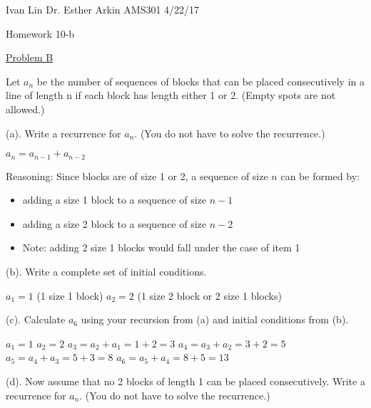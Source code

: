 \documentclass{article}
\begin{document}
Ivan Lin\newline{}
Dr. Esther Arkin\newline{}
AMS301\newline{}
4/22/17

\begin{center}
  Homework 10-b
\end{center}

\underline{Problem B}

Let $a_n$ be the number of sequences of blocks that can be placed consecutively in a line of length n if each block has length either 1 or 2. (Empty spots are not allowed.)\newline{}

(a). Write a recurrence for $a_n$. (You do not have to solve the recurrence.)\newline{}

$a_n=a_{n-1}+a_{n-2}$\newline{}


Reasoning: Since blocks are of size 1 or 2, a sequence of size $n$ can be formed by:
\begin{itemize}
  \item adding a size 1 block to a sequence of size $n-1$
  \item adding a size 2 block to a sequence of size $n-2$
  \item Note: adding 2 size 1 blocks would fall under the case of item 1
\end{itemize}

(b). Write a complete set of initial conditions.\newline{}

$a_1=1$ (1 size 1 block)\newline{}
$a_2=2$ (1 size 2 block or 2 size 1 blocks)\newline{}

(c). Calculate $a_6$ using your recursion from (a) and initial conditions from (b).\newline{}

$a_1=1$\newline{}
$a_2=2$\newline{}
$a_3=a_2+a_1=1+2=3$ \newline{}
$a_4=a_3+a_2=3+2=5$ \newline{}
$a_5=a_4+a_3=5+3=8$\newline{}
$a_6=a_5+a_4=8+5=13$\newline{}

(d). Now assume that no 2 blocks of length 1 can be placed consecutively. Write a recurrence for $a_n$. (You do not have to solve the recurrence.)\newline{}
\end{document}
